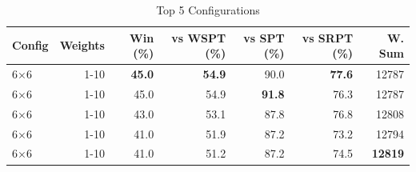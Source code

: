 \begin{table}[htbp]%
\centering%
\begin{tabular}{lrrrrrr}%
\toprule%
\textbf{Config}&\textbf{Weights}&\textbf{Win (\%)}&\textbf{vs WSPT (\%)}&\textbf{vs SPT (\%)}&\textbf{vs SRPT (\%)}&\textbf{W. Sum}\\%
\midrule%
6×6&1-10&\textbf{45.0}&\textbf{54.9}&90.0&\textbf{77.6}&12787\\%
6×6&1-10&45.0&54.9&\textbf{91.8}&76.3&12787\\%
6×6&1-10&43.0&53.1&87.8&76.8&12808\\%
6×6&1-10&41.0&51.9&87.2&73.2&12794\\%
6×6&1-10&41.0&51.2&87.2&74.5&\textbf{12819}\\%
\bottomrule%
\end{tabular}%
\caption{Top 5 Configurations}%
\label{tab:summary}%
\end{table}